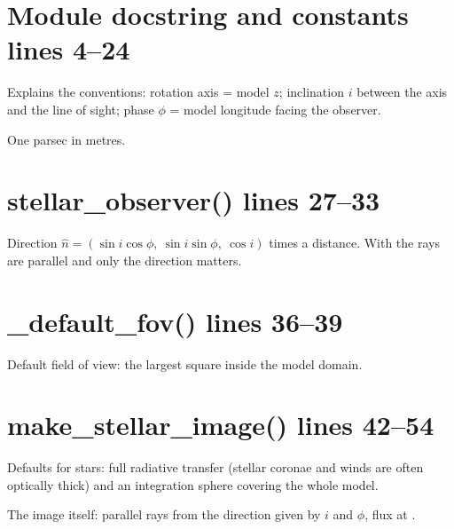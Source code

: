 \section*{\normalsize Module docstring and constants \hfill{\small\mdseries\color{gray}lines 4--24}}

Explains the conventions: rotation axis = model $z$; inclination $i$ between the axis and the line of sight; phase $\phi$ = model longitude facing the observer.

\begin{lines}
\item[L.24] One parsec in metres.
\end{lines}
\section*{\normalsize stellar\_observer() \hfill{\small\mdseries\color{gray}lines 27--33}}

\begin{lines}
\item[L.32] Direction $\hat n=(\sin i\cos\phi,\ \sin i\sin\phi,\ \cos i)$ times a distance. With  the rays are parallel and only the direction matters.
\end{lines}
\section*{\normalsize \_default\_fov() \hfill{\small\mdseries\color{gray}lines 36--39}}

Default field of view: the largest square inside the model domain.

\section*{\normalsize make\_stellar\_image() \hfill{\small\mdseries\color{gray}lines 42--54}}

\begin{lines}
\item[L.50–52] Defaults for stars: full radiative transfer (stellar coronae and winds are often optically thick) and an integration sphere covering the whole model.
\item[L.53] The image itself: parallel rays from the direction given by $i$ and $\phi$, flux at .
\end{lines}
